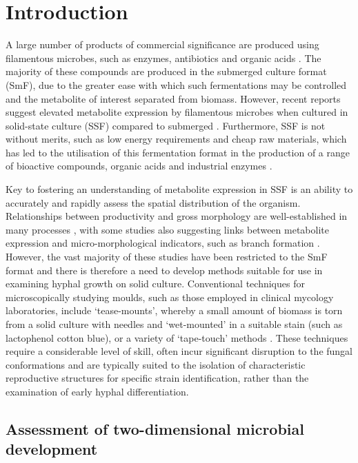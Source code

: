 \section{Introduction}

A large number of products of commercial significance are produced using filamentous microbes, such as enzymes, antibiotics and organic acids \cite{papagiannireview}. The majority of these compounds are produced in the submerged culture format (SmF), due to the greater ease with which such fermentations may be controlled and the metabolite of interest separated from biomass. However, recent reports suggest elevated metabolite expression by filamentous microbes when cultured in solid-state culture (SSF) compared to submerged \cite{tebiesebeke2002,oda2006}. Furthermore, SSF is not without merits, such as low energy requirements and cheap raw materials, which has led to the utilisation of this fermentation format in the production of a range of bioactive compounds, organic acids and industrial enzymes \cite{pandey2000}.

Key to fostering an understanding of metabolite expression in SSF is an ability to accurately and rapidly assess the spatial distribution of the organism. Relationships between productivity and gross morphology are well-established in many processes \cite{papagiannireview}, with some studies also suggesting links between metabolite expression and micro-morphological indicators, such as branch formation \cite{amanullah2002,muller2002}. However, the vast majority of these studies have been restricted to the SmF format and there is therefore a need to develop methods suitable for use in examining hyphal growth on solid culture. Conventional techniques for microscopically studying moulds, such as those employed in clinical mycology laboratories, include \lq tease-mounts', whereby a small amount of biomass is torn from a solid culture with needles and \lq wet-mounted' in a suitable stain (such as lactophenol cotton blue), or a variety of \lq tape-touch' methods \cite{harris2000,rodriguez-tudela1991}. These techniques require a considerable level of skill, often incur significant disruption to the fungal conformations and are typically suited to the isolation of characteristic reproductive structures for specific strain identification, rather than the examination of early hyphal differentiation.

\subsection{Assessment of two-dimensional microbial development}


